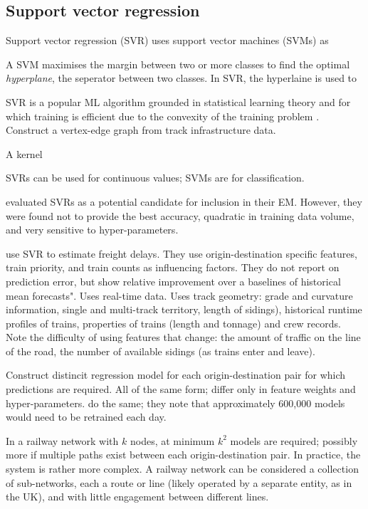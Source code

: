 \documentclass{article}
\begin{document}
\subsection{Support vector regression}

Support vector regression (SVR) uses support vector machines (SVMs) as

A SVM maximises the margin between two or more classes to find the optimal \textit{hyperplane}, the seperator between two classes. In SVR, the hyperlaine is used to 

SVR is a popular ML algorithm grounded in statistical learning theory and for which training is efficient due to the convexity of the training problem \cite{barbour_et_al_2019}.
Construct a vertex-edge graph from track infrastructure data. 

A kernel 

SVRs can be used for continuous values; SVMs are for classification.

\cite{nair_et_al_2019} evaluated SVRs as a potential candidate for inclusion in their EM. However, they were found not to provide the best accuracy, quadratic in training data volume, and very sensitive to hyper-parameters.

\cite{barbour_et_al_2018} use SVR to estimate freight delays. They use origin-destination specific features, train priority, and train counts as influencing factors. They do not report on prediction error, but show relative improvement over a baselines of historical mean forecasts". Uses real-time data. Uses track geometry: grade and curvature information, single and multi-track territory, length of sidings), historical runtime profiles of trains, properties of trains (length and tonnage) and crew records. Note the difficulty of using features that change: the amount of traffic on the line of the road, the number of available sidings (as trains enter and leave).

Construct distincit regression model for each origin-destination pair for which predictions are required. All of the same form; differ only in feature weights and hyper-parameters. \cite{oneto_et_al_2016} do the same; they note that approximately 600,000 models would need to be retrained each day.

In a railway network with $k$ nodes, at minimum $k^2$ models are required; possibly more if multiple paths exist between each origin-destination pair. In practice, the system is rather more complex. A railway network can be considered a collection of sub-networks, each a route or line (likely operated by a separate entity, as in the UK), and with little engagement between different lines.
\end{document}
